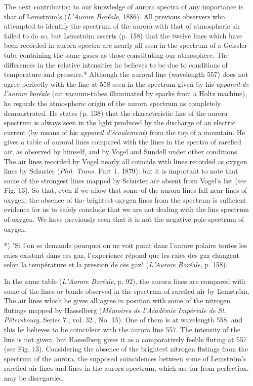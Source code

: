 \documentclass[a4paper, 12pt, oneside, polutonikogreek, english]{article}
\begin{document}
The next contribution to our knowledge of aurora spectra of any importance is that of Lemström's (\emph{L'Aurore Boréale}, 1886). All previous observers who attempted to identify the spectrum of the aurora with that of atmospheric air failed to do so, but Lemström asserts (p. 158) that the twelve lines which have been recorded in aurora spectra are nearly all seen in the spectrum of a Geissler-tube containing the same gases as those constituting our atmosphere. The differences in the relative intensities he believes to be due to conditions of temperature and pressure.* Although the auroral line (wavelength 557) does not agree perfectly with the line at 558 seen in the spectrum given by his \emph{appareil de l'aurore boréale} (air vacuum-tubes illuminated by sparks from a Holtz machine), he regards the atmospheric origin of the aurora spectrum as completely demonstrated. He states (p. 138) that the characteristic line of the aurora spectrum is always seen in the light produced by the discharge of an electric current (by means of his \emph{appareil d'écoulement}) from the top of a mountain. He gives a table of auroral lines compared with the lines in the spectra of rarefied air, as observed by himself, and by Vogel and Sundell under other conditions. The air lines recorded by Vogel nearly all coincide with lines recorded as oxygen lines by Schuster (\emph{Phil. Trans.} Part 1. 1879); but it is important to note that some of the strongest lines mapped by Schuster are absent from Vogel's list (see Fig. 13). So that, even if we allow that some of the aurora lines fall near lines of oxygen, the absence of the brightest oxygen lines from the spectrum is sufficient evidence for us to safely conclude that we are not dealing with the line spectrum of oxygen. We have previously seen that it is not the negative pole spectrum of oxygen.

*) "Si l'on se demande pourquoi on ne voit point dans l'aurore polaire toutes les raies existant dans ces gaz, l'experience répond que les raies des gaz changent selon la température et la pression de ces gaz" (\emph{L'Aurore Boréale}, p. 158).

In the same table (\emph{L'Aurore Boréale}, p. 92), the aurora lines are compared with some of the lines or bands observed in the spectrum of rarefied air by Lemström. The air lines which he gives all agree in position with some of the nitrogen flutings mapped by Hasselberg (\emph{Mémoires de l'Académie Impériale de St. Pétersbourg}, Series 7., vol. 32., No. 15). One of them is at wavelength 558, and this he believes to be coincident with the aurora line 557. The intensity of the line is not given, but Hasselberg gives it as a comparatively feeble fluting at 557 (see Fig. 13). Considering the absence of the brightest nitrogen flutings from the spectrum of the aurora, the supposed coincidences between some of Lemström's rarefied air lines and lines in the aurora spectrum, which are far from perfection, may be disregarded.
\end{document}
